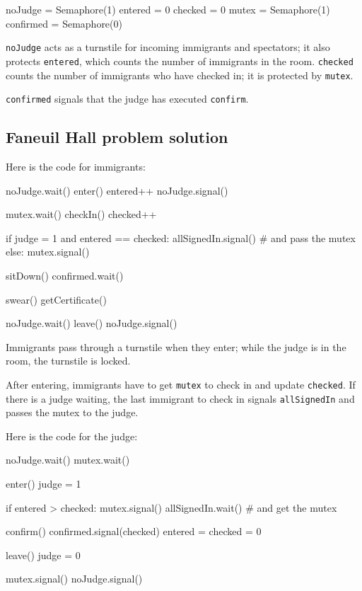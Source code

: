 \documentclass{book}
\begin{document}
\begin{unbreakable}[title={Faneuil Hall problem hint}]{}
noJudge = Semaphore(1)
entered = 0
checked = 0
mutex = Semaphore(1)
confirmed = Semaphore(0)
\end{unbreakable}

{\tt noJudge} acts as a turnstile for incoming immigrants and
spectators; it also protects {\tt entered}, which counts the
number of immigrants in the room.  {\tt checked} counts the
number of immigrants who have checked in; it is protected by
    {\tt mutex}.

{\tt confirmed} signals that the judge has executed {\tt confirm}.



\subsection {Faneuil Hall problem solution}

Here is the code for immigrants:


\begin{unbreakable}[title={Faneuil Hall problem solution (immigrant)}]{}
noJudge.wait()
enter()
entered++
noJudge.signal()

mutex.wait()
checkIn()
checked++

if judge = 1 and entered == checked:
 allSignedIn.signal() # and pass the mutex
else:
 mutex.signal()

sitDown()
confirmed.wait()

swear()
getCertificate()

noJudge.wait()
leave()
noJudge.signal()
\end{unbreakable}

Immigrants pass through a turnstile when they enter; while the
judge is in the room, the turnstile is locked.

After entering, immigrants have to get {\tt mutex} to check
in and update {\tt checked}.  If there is a judge waiting, the
last immigrant to check in signals {\tt allSignedIn} and passes
the mutex to the judge.

Here is the code for the judge:

\begin{unbreakable}[title={Faneuil Hall problem solution (judge)}]{}
noJudge.wait()
mutex.wait()

enter()
judge = 1

if entered > checked:
 mutex.signal()
 allSignedIn.wait() # and get the mutex

confirm()
confirmed.signal(checked)
entered = checked = 0

leave()
judge = 0

mutex.signal()
noJudge.signal()
\end{unbreakable}
\end{document}
